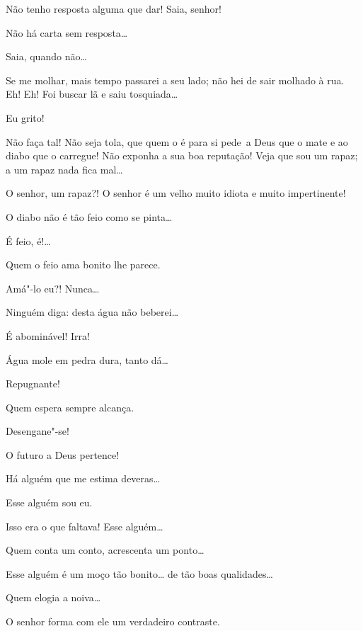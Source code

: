 \begin{linenumbers}
  Não tenho resposta alguma que dar!
Saia, senhor!

  Não há carta sem resposta\ldots{}

  Saia,
quando não\ldots{}

   Se me molhar, mais tempo passarei a seu
lado; não hei de sair molhado à rua. Eh! Eh! Foi buscar lã e saiu
tosquiada\ldots{}

  Eu grito!

  Não faça tal! Não seja tola, que quem o é para si \mbox{pede a} Deus
que o mate e ao diabo que o carregue! Não exponha a sua boa reputação! Veja que
sou um rapaz; a um rapaz nada fica mal\ldots{}

  O senhor, um rapaz?! O senhor é um velho muito idiota e muito
impertinente!

  O diabo não é tão feio como se pinta\ldots{}

  É feio, é!\ldots{}

  Quem o feio ama bonito lhe parece.

  Amá"-lo eu?! Nunca\ldots{}

  Ninguém diga: desta água não beberei\ldots{}

  É abominável! Irra!

  Água mole em pedra dura, tanto dá\ldots{}

  Repugnante!

  Quem espera sempre alcança.

  Desengane"-se!

  O futuro a Deus pertence!

  Há alguém que me estima deveras\ldots{}

  Esse alguém  sou eu.

  Isso era o que faltava!  Esse alguém\ldots{}

  Quem conta um conto, acrescenta um ponto\ldots{}

  Esse alguém é um moço tão bonito\ldots{} de tão boas
qualidades\ldots{}

  Quem elogia a noiva\ldots{}

  O senhor forma com ele um verdadeiro contraste.


\end{linenumbers}
